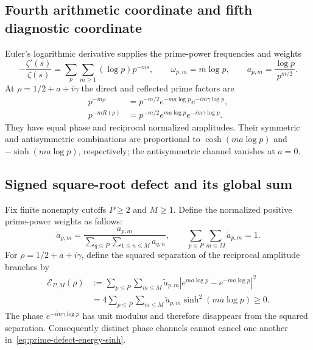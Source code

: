\documentclass[11pt]{amsart}
\theoremstyle{definition}
\theoremstyle{remark}
\begin{document}
\subsection{Fourth arithmetic coordinate and fifth diagnostic coordinate}
Euler's logarithmic derivative supplies the prime-power frequencies and weights
\begin{equation}\label{eq:primechannels}
 -\frac{\zeta'(s)}{\zeta(s)}
 =\sum_p\sum_{m\ge1}(\log p)p^{-ms},
 \qquad
 \omega_{p,m}=m\log p,
 \qquad
 a_{p,m}=\frac{\log p}{p^{m/2}}.
\end{equation}
At $\rho=1/2+a+i\gamma$ the direct and reflected prime factors are
\begin{align}
 p^{-m\rho}&=p^{-m/2}e^{-ma\log p}e^{-im\gamma\log p},\\
 p^{-mR(\rho)}&=p^{-m/2}e^{ma\log p}e^{-im\gamma\log p}.
\end{align}
They have equal phase and reciprocal normalized amplitudes.  Their symmetric and
antisymmetric combinations are proportional to $\cosh(ma\log p)$ and
$-\sinh(ma\log p)$, respectively; the antisymmetric channel vanishes at $a=0$.

\subsection{Signed square-root defect and its global sum}
Fix finite nonempty cutoffs $P\ge2$ and $M\ge1$.  Define the normalized positive
prime-power weights as follows:
\begin{equation}\label{eq:normalized-prime-defect-weights}
 \widetilde a_{p,m}
 =\frac{a_{p,m}}
 {\displaystyle\sum_{q\le P}\sum_{1\le n\le M}a_{q,n}},
 \qquad
 \sum_{p\le P}\sum_{m\le M}\widetilde a_{p,m}=1.
\end{equation}
For $\rho=1/2+a+i\gamma$, define the squared separation of the reciprocal
amplitude branches by
\begin{align}
 \mathcal E_{P,M}(\rho)
 &:=\sum_{p\le P}\sum_{m\le M}\widetilde a_{p,m}
 \left|e^{ma\log p}-e^{-ma\log p}\right|^2\label{eq:prime-defect-energy-definition}\\
 &=4\sum_{p\le P}\sum_{m\le M}\widetilde a_{p,m}
 \sinh^2(ma\log p)\ge0.\label{eq:prime-defect-energy-sinh}
\end{align}
The phase $e^{-im\gamma\log p}$ has unit modulus and therefore disappears from
the squared separation.  Consequently distinct phase channels cannot cancel one
another in~\eqref{eq:prime-defect-energy-sinh}.
\end{document}
